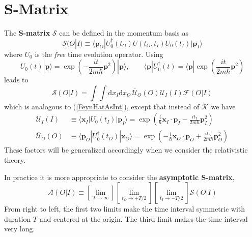 \section{S-Matrix}
The \textbf{S-matrix} $\mathcal{S}$ can be defined in the momentum basis as
\begin{equation}
	\mathcal{S}(O|I) \equiv \langle \mathbf{p}_{O} | U_{0}^{\dagger}(t_{O}) U(t_{O}, t_{I}) U_{0}(t_{I}) | \mathbf{p}_{I} \rangle
\end{equation}
where $U_{0}$ is the \textit{free} time evolution operator. Using
\begin{equation}
	U_{0}(t) | \mathbf{p} \rangle = \exp{\left(- \frac{i t}{2 m \hbar} \mathbf{p}^{2} \right)} | \mathbf{p} \rangle, \qquad \langle \mathbf{p} | U_{0}^{\dagger}(t)  = \langle \mathbf{p} | \exp{\left( \frac{i t}{2 m \hbar} \mathbf{p}^{2} \right)}
\end{equation}
leads to
\begin{equation}
	\mathcal{S}(O|I) = \int \int \mathrm{d} x_{I} \mathrm{d} x_{O} \, \overline{\mathcal{U}}_{O}(O) \mathcal{U}_{I}(I) \mathcal{F}(O|I) \label{SMatrixF}
\end{equation}
which is analogous to (\ref{FeynHatAsInt}), except that instead of $\mathcal{K}$ we have
\begin{align}
	\mathcal{U}_{I}(I) &\equiv \langle \mathbf{x}_{I} | U_{0}(t_{I}) | \mathbf{p}_{I} \rangle =\exp{\left( \frac{i}{\hbar} \mathbf{x}_{I} \cdot \mathbf{p}_{I} - \frac{i t_{I}}{2 m \hbar} \mathbf{p}_{I}^{2} \right)} \\
	\overline{\mathcal{U}}_{O}(O) &\equiv \langle \mathbf{p}_{O} | U_{0}^{\dagger}(t_{O}) | \mathbf{x}_{O} \rangle = \exp{\left( -\frac{i}{\hbar} \mathbf{x}_{O} \cdot \mathbf{p}_{O} + \frac{i t_{O}}{2 m \hbar} \mathbf{p}_{O}^{2} \right)}
\end{align}
These factors will be generalized accordingly when we consider the relativistic theory.

In practice it is more appropriate to consider the \textbf{asymptotic S-matrix},
\begin{equation}
	\mathcal{A}(O|I) \equiv \left[ \lim_{T \rightarrow \infty} \right] \left[ \lim_{t_{O} \rightarrow +T/2} \right] \left[ \lim_{t_{I} \rightarrow -T/2} \right] \mathcal{S}(O|I) \label{AsympSMatrix}
\end{equation}
From right to left, the first two limits make the time interval symmetric with duration $T$ and centered at the origin. The third limit makes the time interval very long.
